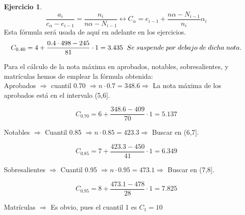 \documentclass[a4paper, 12pt]{article}
\theoremstyle{definition}
\newtheorem{ej}{Ejercicio}
\begin{document}
\begin{ej}
  $$\frac{a_{i}}{c_{\alpha}-e_{i-1}} = \frac{n_{i}}{n\alpha - N_{i-1}} \longleftrightarrow C_{\alpha} = e_{i-1} + \frac{n\alpha - N_{i-1}}{n_{i}}\alpha_{i}$$
Esta fórmula será usada de aquí en adelante en los ejercicios.
\[
C_{0.40} = 4 + \frac{0.4 \cdot 498 -245}{81}\cdot 1 = 3.435 \hspace{0.2cm} Se \hspace{0.1cm} suspende \hspace{0.1cm} por \hspace{0.1cm} debajo \hspace{0.1cm} de \hspace{0.1cm} dicha \hspace{0.1cm} nota.
\]

Para el cálculo de la nota máxima en aprobados, notables, sobresalientes, y matrículas hemos de emplear la fórmula obtenida: \\

Aprobados \(\Rightarrow\) cuantil 0.70 \(\Rightarrow n \cdot 0.7= 348.6 \Rightarrow\) La nota máxima de los aprobados está en el intervalo (5,6].

\[
C_{0.70} = 6 + \frac{348.6 - 409}{70} \cdot 1 = 5.137
\]

Notables \(\Rightarrow\) Cuantil 0.85 \(\Rightarrow n \cdot 0.85 = 423.3 \Rightarrow\) Buscar en (6,7].

\[
C_{0.85} = 7 + \frac{423.3 - 450}{41} \cdot 1 = 6.349 
\]

Sobresalientes \(\Rightarrow\) Cuantil 0.95 \(\Rightarrow n \cdot 0.95 = 473.1 \Rightarrow\) Buscar en (7,8].

\[
C_{0.95} = 8 + \frac{473.1 - 478}{28} \cdot 1 = 7.825
\]

Matrículas \(\Rightarrow\) Es obvio, pues el cuantil 1 es \(C_{1} = 10\)
\end{ej}
\end{document}
